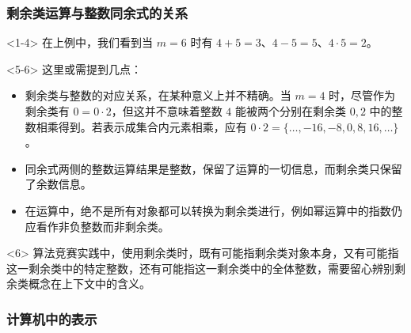\documentclass{../pkslide}
\begin{document}
\begin{frame}
  \frametitle{剩余类运算与整数同余式的关系}
  \begin{onlyenv}<1-4>
    在上例中，我们看到当 $m = 6$ 时有 $4 + 5 = 3$、$4 - 5 = 5$、$4 \cdot 5 = 2$。
    
    
  \end{onlyenv}
  
  \begin{onlyenv}<5-6>
    这里或需提到几点：
    
    \begin{itemize}
      \item 剩余类与整数的对应关系，在某种意义上并不精确。当 $m = 4$ 时，尽管作为剩余类有 $0 = 0 \cdot 2$，但这并不意味着整数 $4$ 能被两个分别在剩余类 $0, 2$ 中的整数相乘得到。若表示成集合内元素相乘，应有 $0 \cdot 2 = \{ \ldots, -16, -8, 0, 8, 16, \ldots \}$。
      \item 同余式两侧的整数运算结果是整数，保留了运算的一切信息，而剩余类只保留了余数信息。
      \item 在运算中，绝不是所有对象都可以转换为剩余类进行，例如幂运算中的指数仍应看作非负整数而非剩余类。
    \end{itemize}
    
    \begin{uncoverenv}<6>
      \emptyline
      算法竞赛实践中，使用剩余类时，既有可能指剩余类对象本身，又有可能指这一剩余类中的特定整数，还有可能指这一剩余类中的全体整数，需要留心辨别剩余类概念在上下文中的含义。
    \end{uncoverenv}
  \end{onlyenv}
\end{frame}

\subsubsection{计算机中的表示}
\end{document}
